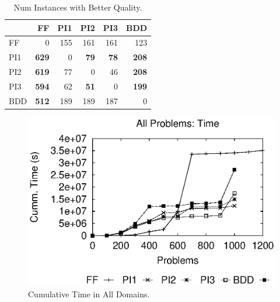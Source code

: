 \documentclass{article}
\begin{document}
       
 

\begin{table}\small\centering \begin{tabular}{|l|rrrrr|}      \hline &  FF  & 
PI1 & PI2  &  PI3  &  BDD  \\\hline
FF	&		0		&		155		&		161		&		161		&		123		\\
PI1	&	{\bf	629}	&		0		&	{\bf	79}	&	{\bf	78}	&	{\bf	208}	\\
PI2	&	{\bf	619}	&		77		&		0		&		46		&	{\bf	208}	\\
PI3	&	{\bf	594}	&		62		&	{\bf	51}	&		0		&	{\bf	199}	\\
BDD & {\bf 512} &  189  &  189  &  187  &  0  \\\hline
\end{tabular}																						
\caption{\label{tab:qualcomp} Num Instances with Better Quality.}
\end{table}

\begin{figure}\centering
\includegraphics[width=\linewidth]{alldom-deadline-time.eps}
\caption{\label{fig:alltotaltime}Cumulative Time  in  All Domains.}
\end{figure} 
   
\end{document}
